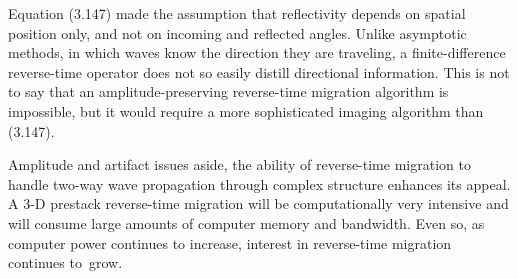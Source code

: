 Equation (3.147) made the assumption that reflectivity depends on spatial position only, and not on incoming and reflected angles. Unlike asymptotic
methods, in which waves know the direction they are traveling, a finite-difference reverse-time operator does not so easily distill directional information.
This is not to say that an amplitude-preserving reverse-time migration algorithm is impossible, but it would require a more sophisticated imaging
algorithm than (3.147).

Amplitude and artifact issues aside, the ability of reverse-time migration to handle two-way wave propagation through complex structure enhances
its appeal. A 3-D prestack reverse-time migration will be computationally very intensive and will consume large amounts of computer
memory and bandwidth. Even so, as computer power continues to increase, interest in reverse-time migration continues to~grow.


